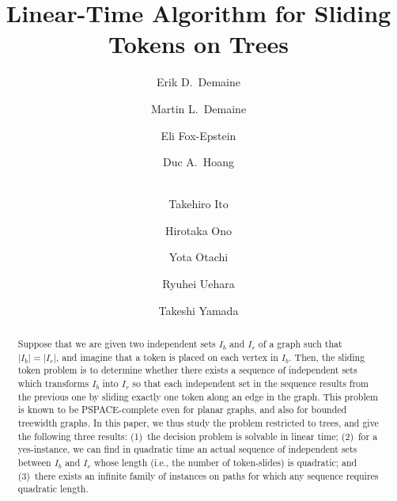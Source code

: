 \documentclass{llncs}
\newcommand{\msize}[1]{{\left|#1\right|}}
\newcommand{\bfI}{I}
\newcounter{one}
\newcounter{two}
\newcounter{three}
\begin{document}
\title{Linear-Time Algorithm for Sliding Tokens on Trees}

\author{
Erik D.~Demaine \and
Martin L.~Demaine \and 
Eli Fox-Epstein \and 
Duc A.~Hoang \and \\
Takehiro Ito \and 
Hirotaka Ono \and
Yota Otachi \and 
Ryuhei Uehara \and 
Takeshi Yamada
}


\maketitle

\begin{abstract}
Suppose that we are given two independent sets $\bfI_b$ and $\bfI_r$ of 
a graph such that $\msize{\bfI_b}=\msize{\bfI_r}$, 
and imagine that a token is placed on each vertex in $\bfI_b$. 
Then, the {\sc sliding token} problem is to determine whether 
there exists a sequence of independent sets which transforms $\bfI_b$ 
into $\bfI_r$ so that each independent set in the sequence results from 
the previous one by sliding exactly one token along an edge in the graph. 
This problem is known to be PSPACE-complete even for planar graphs, and also for bounded treewidth graphs. 
In this paper, we thus study the problem restricted to trees, and give the following three results:
(1)~the decision problem is solvable in linear time; 
(2)~for a yes-instance, we can find in quadratic time an actual sequence of independent sets between $\bfI_b$ and $\bfI_r$ whose length (i.e., the number of token-slides) is quadratic; and 
(3)~there exists an infinite family of instances on paths for which any sequence requires quadratic length.
\end{abstract}
\end{document}
